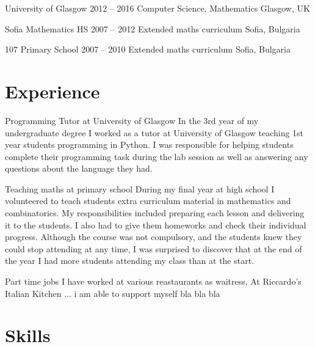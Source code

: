 \documentclass{tccv}
\begin{document}
\begin{yearlist}

\item[University of Glasgow]
     {2012 -- 2016}
     {Computer Science, Mathematics}
     {Glasgow, UK}

\item[Sofia Mathematics HS]
     {2007 -- 2012}
     {Extended maths curriculum}
     {Sofia, Bulgaria}

\item[107 Primary School]
     {2007 -- 2010}
     {Extended maths curriculum}
     {Sofia, Bulgaria}
\end{yearlist}

\section{\LARGE Experience \normalsize}

\begin{skillist}

\item{Programming Tutor at University of Glasgow} {In the 3rd year of my undergraduate degree I worked as a tutor at University of Glasgow teaching 1st year students programming in Python. I was responsible for helping students complete their programming task during the lab session as well as answering any questions about the language they had.}

\item{Teaching maths at primary school} {During my final year at high school I volunteered to teach students extra curriculum material in mathematics and combinatorics. My responsibilities included preparing each lesson and delivering it to the students. I also had to give them homeworks and check their individual progress. Although the course was not compulsory, and the students knew they could stop attending at any time, I was surprised to discover that at the end of the year I had more students attending my class than at the start.}

\item{Part time jobs} {I have worked at various reastaurants as waitress, At Riccardo's Italian Kitchen ... i am able to support myself bla bla bla}

\end{skillist}

\section{\LARGE Skills \normalsize}
\end{document}
